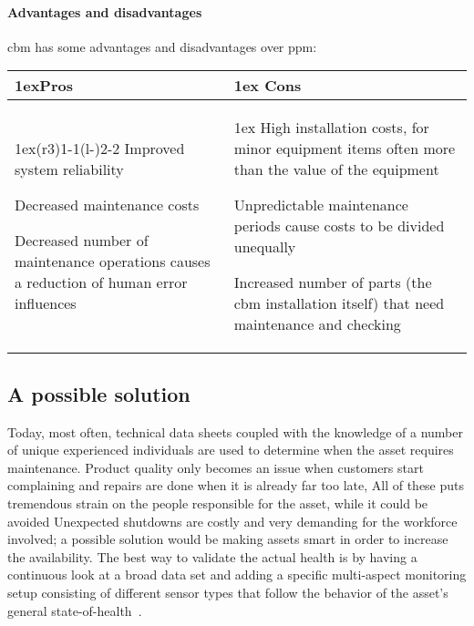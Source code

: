 \paragraph{Advantages and disadvantages}
\acl{cbm} has some advantages and disadvantages over \acl{ppm}:
\begin{table}[!h]
    \begin{tabularx}{\textwidth}{>{\parskip1ex}X@{\kern4\tabcolsep}>{\parskip1ex}X}
        \toprule
        \hfil\bfseries Pros
         &
        \hfil\bfseries Cons
        \\\cmidrule(r{3\tabcolsep}){1-1}\cmidrule(l{-\tabcolsep}){2-2}
        Improved system reliability\par
        Decreased maintenance costs\par
        Decreased number of maintenance operations causes a reduction of human error influences\par
         &
        High installation costs, for minor equipment items often more than the value of the equipment\par
        Unpredictable maintenance periods cause costs to be divided unequally\par
        Increased number of parts (the \acs{cbm} installation itself) that need maintenance and checking\par
        \\\bottomrule
    \end{tabularx}
\end{table}

\subsection{A possible solution}
Today, most often, technical data sheets coupled with the knowledge of a number of unique experienced individuals are used to determine when the asset requires maintenance.
Product quality only becomes an issue when customers start complaining and repairs are done when it is already far too late,
All of these puts tremendous strain on the people responsible for the asset, while it could be avoided
Unexpected shutdowns are costly and very demanding for the workforce involved; a possible solution would be making assets smart in order to increase the availability.
The best way to validate the actual health is by having a continuous look at a broad data set and adding a specific multi-aspect monitoring setup
consisting of different sensor types that follow the behavior of the asset's general state-of-health~\cite{Misc:zensor_official_website}.

